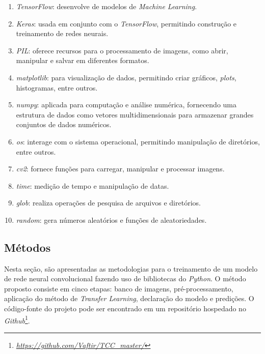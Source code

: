 \begin{enumerate}[label=\alph*)]
    \item \textit{TensorFlow}: desenvolve de modelos de \textit{Machine Learning}.
    
    \item \textit{Keras}: usada em conjunto com o \textit{TensorFlow}, permitindo construção e treinamento de redes neurais.
    
    \item \textit{PIL}: oferece recursos para o processamento de imagens, como abrir, manipular e salvar em diferentes formatos.
        
    \item \textit{matplotlib}: para visualização de dados, permitindo criar gráficos, \textit{plots}, histogramas, entre outros.
    
    \item \textit{numpy}: aplicada para computação e análise numérica, fornecendo uma estrutura de dados como vetores multidimensionais para armazenar grandes conjuntos de dados numéricos.

    \item \textit{os}: interage com o sistema operacional, permitindo manipulação de diretórios, entre outros.

    \item \textit{cv2}: fornece funções para carregar, manipular e processar imagens.

    \item \textit{time}: medição de tempo e manipulação de datas.

    \item \textit{glob}: realiza operações de pesquisa de arquivos e diretórios.

    \item \textit{random}: gera números aleatórios e funções de aleatoriedades.
\end{enumerate}




\subsection{\esp Métodos} \label{metodos}

Nesta seção, são apresentadas as metodologias para o treinamento de um modelo de rede neural convolucional fazendo uso de bibliotecas do \textit{Python}. O método proposto consiste em cinco etapas: banco de imagens, pré-processamento, aplicação do método de \textit{Transfer Learning}, declaração do modelo e predições. O código-fonte do projeto pode ser encontrado em um repositório hospedado no \textit{Github}\footnote{\href{https://github.com/Vaftir/TCC_master/}{\textit{https://github.com/Vaftir/TCC\_master/}}}.


